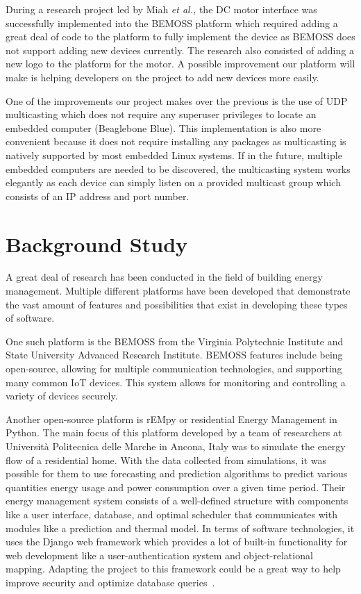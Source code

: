 During a research project led by Miah \textit{et al.,} the DC motor interface was successfully
implemented into the BEMOSS platform which required adding a great deal of
 code
to the platform to fully implement the device as BEMOSS does not support adding
new devices currently. The research also consisted of adding a new
 logo to the
platform for the motor. A possible improvement our platform will make is helping
developers on the project to add new devices more easily.

One of the improvements our project makes over the previous is the use of UDP
 multicasting which does not require any superuser privileges to locate an
embedded computer (Beaglebone Blue). This implementation is also more convenient
because it does not require installing any packages as multicasting is natively
supported by most embedded Linux systems. If in the future, multiple embedded
computers are needed to be discovered, the multicasting system works elegantly
as each device can simply listen on a provided multicast group which consists of
an IP address and port number.

\section{Background Study}
A great deal of research has been conducted in the field of building energy management. Multiple different platforms have been developed that demonstrate the vast amount of features and possibilities that exist in developing these types of software.

One such platform is the BEMOSS from the Virginia Polytechnic Institute and State
University Advanced Research Institute. BEMOSS features include being
open-source, allowing for multiple communication technologies, and supporting
many common IoT devices. This system allows for monitoring and controlling a
variety of devices securely.

Another open-source platform is rEMpy or residential Energy Management in
Python. The main focus of this platform developed by a team of researchers at
Universit\`{a} Politecnica delle Marche in Ancona, Italy was to simulate the
energy flow of a residential home. With the data collected from simulations, it
was possible for them to use forecasting and prediction algorithms to predict
various quantities  energy usage and power consumption over a given time period. Their energy management system consists of a well-defined structure with components like a user interface, database, and optimal scheduler that communicates with modules like a prediction and thermal model. In terms of software technologies, it uses the Django web framework which provides a lot of built-in functionality for web development like a user-authentication system and object-relational mapping. Adapting the project to this framework could be a great way to help improve security and optimize database queries~\cite{fagiani2017}.

